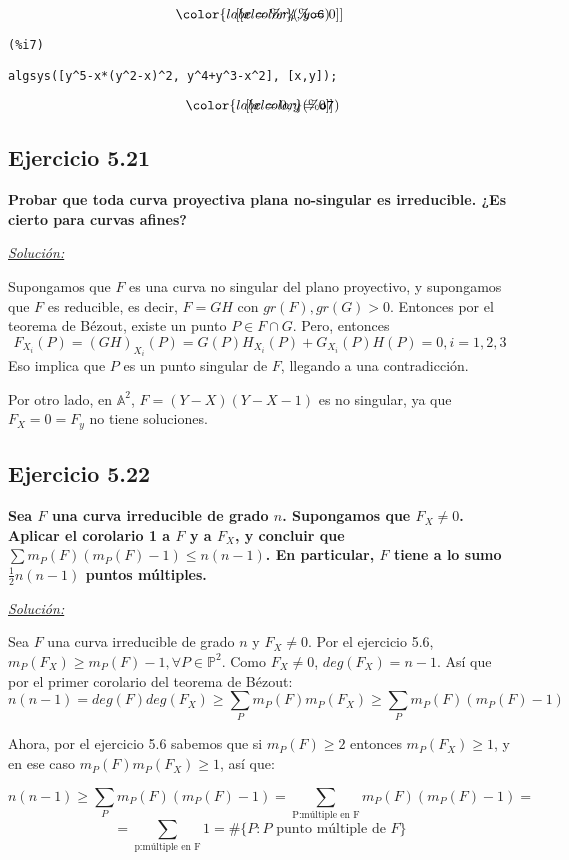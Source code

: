 \[\displaystyle
\parbox{10ex}{$\color{labelcolor}\mathrm{\tt (\%o6) }\quad $}
[[x=\mathit{\%r4},y=0]]\mbox{}
\]

\noindent
\begin{minipage}[t]{8ex}\color{red}\bf
\begin{verbatim}
(%i7) 
\end{verbatim}
\end{minipage}
\begin{minipage}[t]{\textwidth}\color{blue}
\begin{verbatim}
algsys([y^5-x*(y^2-x)^2, y^4+y^3-x^2], [x,y]);
\end{verbatim}
\end{minipage}

\[\displaystyle
\parbox{10ex}{$\color{labelcolor}\mathrm{\tt (\%o7) }\quad $}
[[x=0,y=0]]\mbox{}
\]

\subsection{Ejercicio 5.21}

\textbf{Probar que toda curva proyectiva plana no-singular es irreducible. ¿Es cierto para curvas afines?}

\underline{\textit{Solución:}}

Supongamos que $F$ es una curva no singular del plano proyectivo, y supongamos que $F$ es reducible, es decir, $F=GH$ con $gr(F),gr(G)>0$. Entonces por el teorema de Bézout, existe un punto $P\in F\cap G$. Pero, entonces
$$F_{X_i}(P)=(GH)_{X_i}(P)=G(P)H_{X_i}(P)+G_{X_i}(P)H(P)=0 , i=1,2,3$$
Eso implica que $P$ es un punto singular de $F$, llegando a una contradicción.

Por otro lado, en $\mathbb{A}^2$, $F=(Y-X)(Y-X-1)$ es no singular, ya que $F_X=0=F_y$ no tiene soluciones. 

\subsection{Ejercicio 5.22}

\textbf{Sea $F$ una curva irreducible de grado $n$. Supongamos que $F_X\neq 0$. Aplicar el corolario 1 a $F$ y a $F_X$, y concluir que $\sum m_P(F)(m_P(F)-1)\le n(n-1)$.  En particular, $F$ tiene a lo sumo $\frac{1}{2}n(n-1)$ puntos múltiples.}

\underline{\textit{Solución:}}

Sea $F$ una curva irreducible de grado $n$ y $F_X\neq 0$. Por el ejercicio 5.6, $m_P(F_X)\ge m_P(F)-1, \forall P\in \mathbb{P}^2$. Como $F_X\neq 0$, $deg(F_X)=n-1$. Así que por el primer corolario del teorema de Bézout:
$$n(n-1)=deg(F)deg(F_X)\ge \sum_P m_P(F)m_P(F_X)\ge \sum_P m_P(F)(m_P(F)-1) $$

Ahora, por el ejercicio 5.6 sabemos que si $m_P(F)\ge 2$ entonces $m_P(F_X)\ge 1$, y en ese caso $m_P(F)m_P(F_X)\ge 1$, así que:

$$n(n-1) \ge \sum_P m_P(F)(m_P(F)-1)=\sum_{\text{P:múltiple en F}}m_P(F)(m_P(F)-1)=$$ $$=\sum_{\text{p:múltiple en F}} 1 = \# \{P: P\text{ punto múltiple de } F\} $$


